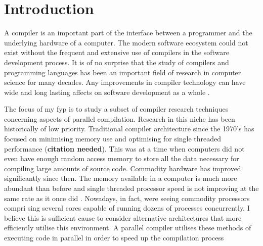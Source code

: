 \chapter{Introduction} \label{introduction}

A \gls{compiler} is an important part of the interface between a programmer
and the underlying hardware of a computer. The modern software ecosystem
could not exist without the frequent and extensive use of compilers in
the software development process. It is of no surprise that the study of
compilers and programming languages has been an important field of research
in computer science for many decades. Any improvements in compiler technology
can have wide and long lasting affects on software development as a whole
\citep{hall_compiler_2009}.

The focus of my \gls{fyp} is to study a subset of compiler research techniques
concerning aspects of parallel compilation. Research in this niche has been
historically of low priority. Traditional compiler architecture since the
1970’s has focused on minimising memory use and optimising for single threaded
performance (\textbf{citation needed}). This was at a time when computers
did not even have enough random access memory to store all the data necessary
for compiling large amounts of source code. Commodity hardware has improved
significantly since then. The memory available in a computer is much more
abundant than before and single threaded processor speed is not improving at
the same rate as it once did \citep{shalf_future_2020, williams_whats_2017}.
Nowadays, in fact, were seeing commodity processors compri sing several
cores capable of running dozens of processes concurrently. I believe this is
sufficient cause to consider alternative architectures that more efficiently
utilise this environment. A parallel compiler utilises these methods of
executing code in parallel in order to speed up the compilation process


